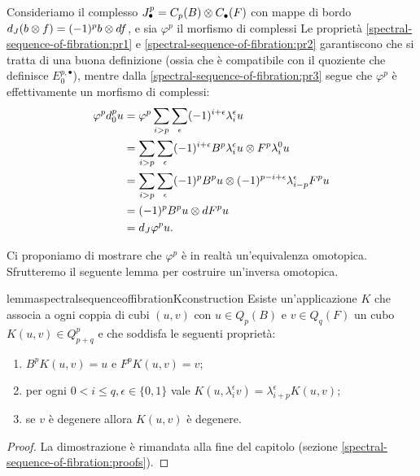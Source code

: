 Consideriamo il complesso $J^p_\bullet=C_p(B)\mathbin{\otimes} C_\bullet(F)$ con mappe di bordo $d_J(b\mathbin{\otimes} f)=(-1)^pb\mathbin{\otimes} df$, e sia $\varphi^p$ il morfismo di complessi
Le proprietà \ref{spectral-sequence-of-fibration:pr1} e \ref{spectral-sequence-of-fibration:pr2} garantiscono che si tratta di una buona definizione (ossia che è compatibile con il quoziente che definisce $E^{p,\bullet}_0$), mentre dalla \ref{spectral-sequence-of-fibration:pr3} segue che $\varphi^p$ è effettivamente un morfismo di complessi:
\begin{align*}
\varphi^pd^p_0u&=\varphi^p\sum_{i>p}\sum_\epsilon(-1)^{i+\epsilon}\lambda^\epsilon_iu\\
&=\sum_{i>p}\sum_\epsilon(-1)^{i+\epsilon}B^p\lambda^\epsilon_iu\mathbin{\otimes} F^p\lambda^0_iu\\
&=\sum_{i>p}\sum_\epsilon(-1)^pB^pu\mathbin{\otimes}(-1)^{p-i+\epsilon}\lambda^\epsilon_{i-p}F^pu\\
&=(-1)^pB^pu\mathbin{\otimes} dF^pu\\
&=d_J\varphi^pu.
\end{align*}

Ci proponiamo di mostrare che $\varphi^p$ è in realtà un'equivalenza omotopica. Sfrutteremo il seguente lemma per costruire un'inversa omotopica.

\begin{restatable}{lemma}{spectralsequenceoffibrationKconstruction}
Esiste un'applicazione $K$ che associa a ogni coppia di cubi $(u,v)$ con $u\in Q_p(B)$ e $v\in Q_q(F)$ un cubo $K(u,v)\in Q^p_{p+q}$ e che soddisfa le seguenti proprietà:
\begin{enumerate}
\item\label{spectral-sequence-of-fibration-K-construction:pr1} $B^pK(u,v)=u$ e $F^pK(u,v)=v$;
\item\label{spectral-sequence-of-fibration-K-construction:pr2} per ogni $0<i\le q,\epsilon\in\{0,1\}$ vale $K(u,\lambda^\epsilon_iv)=\lambda^\epsilon_{i+p}K(u,v)$;
\item\label{spectral-sequence-of-fibration-K-construction:pr3} se $v$ è degenere allora $K(u,v)$ è degenere.
\end{enumerate}
\end{restatable}
\begin{proof}
La dimostrazione è rimandata alla fine del capitolo (sezione \ref{spectral-sequence-of-fibration:proofs}).
\end{proof}

